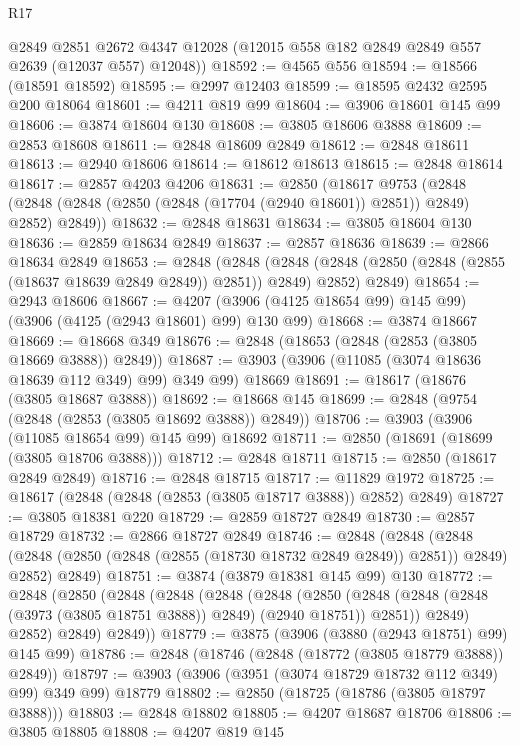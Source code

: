\begin{lexlean}{R17}
\begin{coremodule}
      @2849
      @2851
      @2672
      @4347
      @12028
      (@12015 @558 @182 @2849 @2849 @557 @2639 (@12037 @557) @12048))
@18592 := @4565 @556
@18594 := @18566 (@18591 @18592)
@18595 := @2997 @12403
@18599 := @18595 @2432 @2595 @200 @18064
@18601 := @4211 @819 @99
@18604 := @3906 @18601 @145 @99
@18606 := @3874 @18604 @130
@18608 := @3805 @18606 @3888
@18609 := @2853 @18608
@18611 := @2848 @18609 @2849
@18612 := @2848 @18611
@18613 := @2940 @18606
@18614 := @18612 @18613
@18615 := @2848 @18614
@18617 := @2857 @4203 @4206
@18631 := @2850
    (@18617
      @9753
      (@2848 (@2848 (@2848 (@2850 (@2848 (@17704 (@2940 @18601)) @2851)) @2849) @2852) @2849))
@18632 := @2848 @18631
@18634 := @3805 @18604 @130
@18636 := @2859 @18634 @2849
@18637 := @2857 @18636
@18639 := @2866 @18634 @2849
@18653 := @2848
    (@2848
      (@2848 (@2848 (@2850 (@2848 (@2855 (@18637 @18639 @2849 @2849)) @2851)) @2849) @2852)
      @2849)
@18654 := @2943 @18606
@18667 := @4207 (@3906 (@4125 @18654 @99) @145 @99) (@3906 (@4125 (@2943 @18601) @99) @130 @99)
@18668 := @3874 @18667
@18669 := @18668 @349
@18676 := @2848 (@18653 (@2848 (@2853 (@3805 @18669 @3888)) @2849))
@18687 := @3903 (@3906 (@11085 (@3074 @18636 @18639 @112 @349) @99) @349 @99) @18669
@18691 := @18617 (@18676 (@3805 @18687 @3888))
@18692 := @18668 @145
@18699 := @2848 (@9754 (@2848 (@2853 (@3805 @18692 @3888)) @2849))
@18706 := @3903 (@3906 (@11085 @18654 @99) @145 @99) @18692
@18711 := @2850 (@18691 (@18699 (@3805 @18706 @3888)))
@18712 := @2848 @18711
@18715 := @2850 (@18617 @2849 @2849)
@18716 := @2848 @18715
@18717 := @11829 @1972
@18725 := @18617 (@2848 (@2848 (@2853 (@3805 @18717 @3888)) @2852) @2849)
@18727 := @3805 @18381 @220
@18729 := @2859 @18727 @2849
@18730 := @2857 @18729
@18732 := @2866 @18727 @2849
@18746 := @2848
    (@2848
      (@2848 (@2848 (@2850 (@2848 (@2855 (@18730 @18732 @2849 @2849)) @2851)) @2849) @2852)
      @2849)
@18751 := @3874 (@3879 @18381 @145 @99) @130
@18772 := @2848
    (@2850
      (@2848
        (@2848
          (@2848
            (@2848
              (@2850
                (@2848 (@2848 (@2848 (@3973 (@3805 @18751 @3888)) @2849) (@2940 @18751)) @2851))
              @2849)
            @2852)
          @2849)
        @2849))
@18779 := @3875 (@3906 (@3880 (@2943 @18751) @99) @145 @99)
@18786 := @2848 (@18746 (@2848 (@18772 (@3805 @18779 @3888)) @2849))
@18797 := @3903 (@3906 (@3951 (@3074 @18729 @18732 @112 @349) @99) @349 @99) @18779
@18802 := @2850 (@18725 (@18786 (@3805 @18797 @3888)))
@18803 := @2848 @18802
@18805 := @4207 @18687 @18706
@18806 := @3805 @18805
@18808 := @4207 @819 @145

\end{coremodule}
\end{lexlean}
